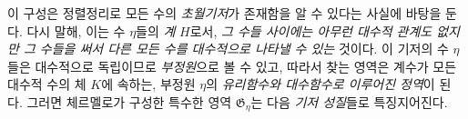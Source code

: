 
이 구성은 정렬정리로 모든 수의 \emph{초월기저}가 존재함을 알 수 있다는 사실에 바탕을 둔다. 다시 말해, 이는 수 $\eta$들의 \emph{계} $H$로서, \emph{그 수들 사이에는 아무런 대수적 관계도 없지만 그 수들을 써서 다른 모든 수를 대수적으로 나타낼 수 있는} 것이다. 이 기저의 수 $\eta$들은 대수적으로 독립이므로 \emph{부정원}으로 볼 수 있고, 따라서 찾는 영역은 계수가 모든 대수적 수의 체 $K$에 속하는, 부정원 $\eta$의 \emph{유리함수와 대수함수로 이루어진 정역}이 된다. 그러면 체르멜로가 구성한 특수한 영역 $\mathfrak G_\eta$는 다음 \emph{기저 성질}들로 특징지어진다.
